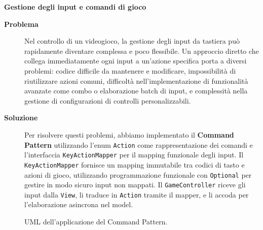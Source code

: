 \documentclass[a4paper,12pt]{report}
\begin{document}
\newpage
\noindent
\textbf{Gestione degli input e comandi di gioco}
\begin{description}
	\item[\textbf{Problema}]
	      Nel controllo di un videogioco, la gestione degli input da tastiera può rapidamente diventare complessa e poco flessibile. Un approccio diretto che collega immediatamente ogni input a un'azione
	      specifica porta a diversi problemi: codice difficile da mantenere e modificare, impossibilità di riutilizzare azioni comuni, difficoltà nell'implementazione di funzionalità avanzate come
	      combo o elaborazione batch di input, e complessità nella gestione di configurazioni di controlli personalizzabili.

	\item[\textbf{Soluzione}]
	      Per risolvere questi problemi, abbiamo implementato il \textbf{Command Pattern} utilizzando l'enum \texttt{Action} come rappresentazione dei comandi e l'interfaccia
	      \texttt{KeyActionMapper} per il mapping funzionale degli input. Il \texttt{KeyActionMapper} fornisce un mapping immutabile tra codici di tasto e azioni di gioco, utilizzando
	      programmazione funzionale con \texttt{Optional} per gestire in modo sicuro input non mappati. Il \texttt{GameController} riceve gli input dalla \texttt{View}, li traduce in
	      \texttt{Action} tramite il mapper, e li accoda per l'elaborazione asincrona nel model.
\end{description}
\begin{figure}[H]
	\centering{}
	
	\caption{UML dell'applicazione del Command Pattern.}
	\label{img:command}
\end{figure}
\end{document}
